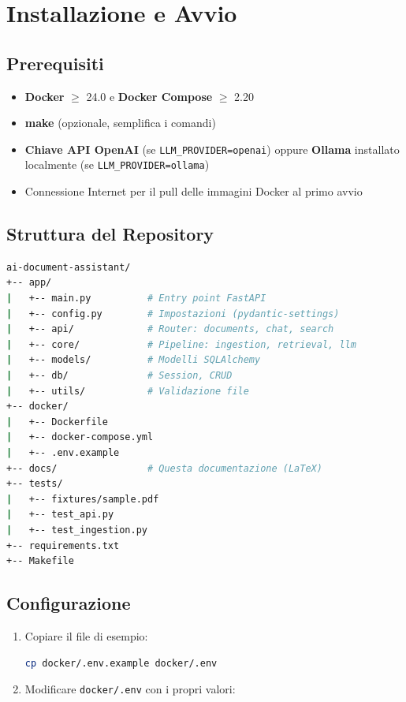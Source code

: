 \chapter{Installazione e Avvio}

\section{Prerequisiti}

\begin{itemize}
  \item \textbf{Docker} $\geq$ 24.0 e \textbf{Docker Compose} $\geq$ 2.20
  \item \textbf{make} (opzionale, semplifica i comandi)
  \item \textbf{Chiave API OpenAI} (se \texttt{LLM\_PROVIDER=openai}) oppure
        \textbf{Ollama} installato localmente (se \texttt{LLM\_PROVIDER=ollama})
  \item Connessione Internet per il pull delle immagini Docker al primo avvio
\end{itemize}

\section{Struttura del Repository}

\begin{lstlisting}[language=bash]
ai-document-assistant/
+-- app/
|   +-- main.py          # Entry point FastAPI
|   +-- config.py        # Impostazioni (pydantic-settings)
|   +-- api/             # Router: documents, chat, search
|   +-- core/            # Pipeline: ingestion, retrieval, llm
|   +-- models/          # Modelli SQLAlchemy
|   +-- db/              # Session, CRUD
|   +-- utils/           # Validazione file
+-- docker/
|   +-- Dockerfile
|   +-- docker-compose.yml
|   +-- .env.example
+-- docs/                # Questa documentazione (LaTeX)
+-- tests/
|   +-- fixtures/sample.pdf
|   +-- test_api.py
|   +-- test_ingestion.py
+-- requirements.txt
+-- Makefile
\end{lstlisting}

\section{Configurazione}

\begin{enumerate}
  \item Copiare il file di esempio:
\begin{lstlisting}[language=bash]
cp docker/.env.example docker/.env
\end{lstlisting}

  \item Modificare \texttt{docker/.env} con i propri valori:
\end{enumerate}

